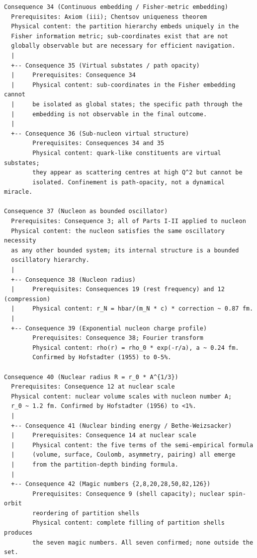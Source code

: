 \begin{center}
\small\ttfamily
\begin{verbatim}
Consequence 34 (Continuous embedding / Fisher-metric embedding)
  Prerequisites: Axiom (iii); Chentsov uniqueness theorem
  Physical content: the partition hierarchy embeds uniquely in the
  Fisher information metric; sub-coordinates exist that are not
  globally observable but are necessary for efficient navigation.
  |
  +-- Consequence 35 (Virtual substates / path opacity)
  |     Prerequisites: Consequence 34
  |     Physical content: sub-coordinates in the Fisher embedding cannot
  |     be isolated as global states; the specific path through the
  |     embedding is not observable in the final outcome.
  |
  +-- Consequence 36 (Sub-nucleon virtual structure)
        Prerequisites: Consequences 34 and 35
        Physical content: quark-like constituents are virtual substates;
        they appear as scattering centres at high Q^2 but cannot be
        isolated. Confinement is path-opacity, not a dynamical miracle.

Consequence 37 (Nucleon as bounded oscillator)
  Prerequisites: Consequence 3; all of Parts I-II applied to nucleon
  Physical content: the nucleon satisfies the same oscillatory necessity
  as any other bounded system; its internal structure is a bounded
  oscillatory hierarchy.
  |
  +-- Consequence 38 (Nucleon radius)
  |     Prerequisites: Consequences 19 (rest frequency) and 12 (compression)
  |     Physical content: r_N = hbar/(m_N * c) * correction ~ 0.87 fm.
  |
  +-- Consequence 39 (Exponential nucleon charge profile)
        Prerequisites: Consequence 38; Fourier transform
        Physical content: rho(r) = rho_0 * exp(-r/a), a ~ 0.24 fm.
        Confirmed by Hofstadter (1955) to 0-5%.

Consequence 40 (Nuclear radius R = r_0 * A^{1/3})
  Prerequisites: Consequence 12 at nuclear scale
  Physical content: nuclear volume scales with nucleon number A;
  r_0 ~ 1.2 fm. Confirmed by Hofstadter (1956) to <1%.
  |
  +-- Consequence 41 (Nuclear binding energy / Bethe-Weizsacker)
  |     Prerequisites: Consequence 14 at nuclear scale
  |     Physical content: the five terms of the semi-empirical formula
  |     (volume, surface, Coulomb, asymmetry, pairing) all emerge
  |     from the partition-depth binding formula.
  |
  +-- Consequence 42 (Magic numbers {2,8,20,28,50,82,126})
        Prerequisites: Consequence 9 (shell capacity); nuclear spin-orbit
        reordering of partition shells
        Physical content: complete filling of partition shells produces
        the seven magic numbers. All seven confirmed; none outside the set.
\end{verbatim}
\end{center}

